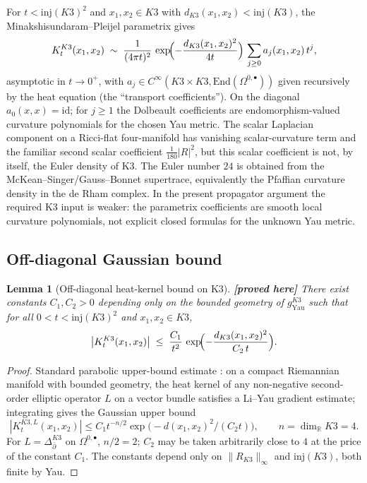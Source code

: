 \documentclass[11pt]{amsart}
\providecommand{\ClaimStatusProvedHere}[1][]{\textbf{[proved here]}}
\providecommand{\dbar}{\bar\partial}
\providecommand{\R}{\mathbb{R}}
\newtheorem{lemma}[theorem]{Lemma}
\theoremstyle{definition}
\theoremstyle{remark}
\begin{document}
For $t < \mathrm{inj}(K3)^2$ and $x_1,x_2 \in K3$ with
$d_{K3}(x_1,x_2) < \mathrm{inj}(K3)$, the
Minakshisundaram--Pleijel parametrix
\cite[Thm.~$2.30$]{BerlineGetzlerVergne1992} gives
\begin{equation}
  \label{eq:K3-mp-expansion}
  K^{K3}_t(x_1,x_2)
  \;\sim\;
  \frac{1}{(4\pi t)^2}\,
  \exp\!\Bigl(-\frac{d_{K3}(x_1,x_2)^2}{4t}\Bigr)\,
  \sum_{j \geq 0} a_j(x_1,x_2)\, t^j,
\end{equation}
asymptotic in $t \to 0^+$, with $a_j \in C^\infty(K3 \times K3,
\mathrm{End}(\Omega^{0,\bullet}))$ given recursively by the heat
equation (the ``transport coefficients''). On the diagonal
$a_0(x,x)=\mathrm{id}$; for $j\geq1$ the Dolbeault coefficients are
endomorphism-valued curvature polynomials for the chosen Yau metric.
The scalar Laplacian component on a Ricci-flat four-manifold has
vanishing scalar-curvature term and the familiar second scalar
coefficient $\tfrac{1}{180}|R|^2$, but this scalar coefficient is not,
by itself, the Euler density of K3. The Euler number $24$ is obtained
from the
McKean--Singer/Gauss--Bonnet supertrace, equivalently the Pfaffian
curvature density in the de Rham complex. In the present propagator
argument the required K3 input is weaker: the parametrix coefficients
are smooth local curvature polynomials, not explicit closed formulas
for the unknown Yau metric.

\subsection{Off-diagonal Gaussian bound}

\begin{lemma}[Off-diagonal heat-kernel bound on K3]
\label{lem:K3-off-diagonal}
\ClaimStatusProvedHere
There exist constants $C_1, C_2 > 0$ depending only on the bounded
geometry of $g^{K3}_{\mathrm{Yau}}$ such that for all
$0 < t < \mathrm{inj}(K3)^2$ and $x_1, x_2 \in K3$,
\[
  \bigl|K^{K3}_t(x_1,x_2)\bigr|
  \;\leq\;
  \frac{C_1}{t^2}\,
  \exp\!\Bigl(-\frac{d_{K3}(x_1,x_2)^2}{C_2\,t}\Bigr).
\]
\end{lemma}

\begin{proof}
Standard parabolic upper-bound estimate
\cite[Cor.~$3.1$]{LiYau1986}: on a compact Riemannian manifold with
bounded geometry, the heat kernel of any non-negative second-order
elliptic operator $L$ on a vector bundle satisfies a Li--Yau
gradient estimate; integrating gives the Gaussian upper bound
\[
  |K^{K3,L}_t(x_1,x_2)| \leq C_1 t^{-n/2} \exp\bigl(-d(x_1,x_2)^2/(C_2 t)\bigr),
  \qquad n = \dim_\R K3 = 4.
\]
For $L = \Delta_{\dbar}^{K3}$ on $\Omega^{0,\bullet}$, $n/2 = 2$;
$C_2$ may be taken arbitrarily close to $4$ at the price of the
constant $C_1$. The constants depend only on
$\|R_{K3}\|_\infty$ and $\mathrm{inj}(K3)$, both finite by Yau.
\end{proof}
\end{document}
